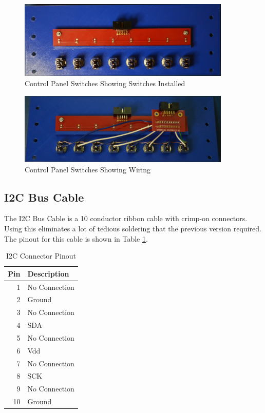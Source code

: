 \documentclass[10pt, openany]{book}
\begin{document}
\begin{figure}[ht!]
  \centering
  \includegraphics[width=0.9\textwidth]{../Pict/Switch-Installed.jpg}
  \caption{Control Panel Switches Showing Switches Installed}
  \label{fig:SwitchInstalled}
\end{figure}

\begin{figure}[ht!]
  \centering
  \includegraphics[width=0.9\textwidth]{../Pict/Switch-Wired.jpg}
  \caption{Control Panel Switches Showing Wiring}
  \label{fig:SwitchWired}
\end{figure}

\subsection{I2C Bus Cable}
The I2C Bus Cable is a 10 conductor ribbon cable with crimp-on connectors.  Using this eliminates a lot of tedious soldering that the previous version required.  The pinout for this cable is shown in Table \ref{tbl:I2C-Pins}.

\begin{table}[ht!]
  \caption{I2C Connector Pinout}
  \label{tbl:I2C-Pins}
  \centering
  \begin{tabular}{|r|l|}
    \hline
    Pin & Description\\
    \hline
    1 & No Connection\\
    2 & Ground\\
    3 & No Connection\\
    4 & SDA\\
    5 & No Connection\\
    6 & Vdd\\
    7 & No Connection\\
    8 & SCK\\
    9 & No Connection\\
    10 & Ground\\
    \hline
  \end{tabular}
\end{table}
\end{document}
